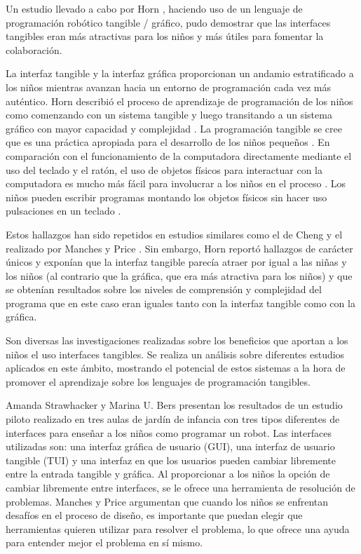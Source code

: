 Un estudio llevado a cabo por Horn \cite{Horn}, haciendo uso de un lenguaje de programación robótico tangible / gráfico, pudo demostrar que las interfaces tangibles eran más atractivas para los niños y más útiles para fomentar la colaboración. 

La interfaz tangible y la interfaz gráfica proporcionan un andamio estratificado a los niños mientras avanzan hacia un entorno de programación cada vez más auténtico. Horn describió el proceso de aprendizaje de programación de los niños como comenzando con un sistema tangible y luego transitando a un sistema gráfico con mayor capacidad y complejidad \cite{Bers}. La programación tangible se cree que es una práctica apropiada para el desarrollo de los niños pequeños \cite{McNerney}. En comparación con el funcionamiento de la computadora directamente mediante el uso del teclado y el ratón, el uso de objetos físicos para interactuar con la computadora es mucho más fácil para involucrar a los niños en el proceso \cite{McNerney}. Los niños pueden escribir programas montando los objetos físicos sin hacer uso pulsaciones en un teclado \cite{Horn}\cite{McNerney}.

Estos hallazgos han sido repetidos en estudios similares como el de Cheng \cite{Cheng} y el realizado por Manches y Price \cite{Manches}. Sin embargo, Horn \cite{Horn} reportó hallazgos de carácter únicos y exponían que la interfaz tangible parecía atraer por igual a las niñas y los niños (al contrario que la gráfica, que era más atractiva para los niños) y que se obtenían resultados sobre los niveles de comprensión y complejidad del programa que en este caso eran iguales tanto con la interfaz tangible como con la gráfica.

Son diversas las investigaciones realizadas sobre los beneficios que aportan a los niños el uso interfaces tangibles. Se realiza un análisis sobre diferentes estudios aplicados en este ámbito, mostrando el potencial de estos sistemas a la hora de promover el aprendizaje sobre los lenguajes de programación tangibles.

Amanda Strawhacker y Marina U. Bers \cite{Strawhacker} presentan los resultados de un estudio piloto realizado en tres aulas de jardín de infancia con tres tipos diferentes de interfaces para enseñar a los niños como programar un robot. Las interfaces utilizadas son: una interfaz gráfica de usuario (GUI), una interfaz de usuario tangible (TUI) y una interfaz en que los usuarios pueden cambiar libremente entre la entrada tangible y gráfica. Al proporcionar a los niños la opción de cambiar libremente entre interfaces, se le ofrece una herramienta de resolución de problemas. Manches y Price \cite{Manches} argumentan que cuando los niños se enfrentan desafíos en el proceso de diseño, es importante que puedan elegir que herramientas quieren utilizar para resolver el problema, lo que ofrece una ayuda para entender mejor el problema en sí mismo.

